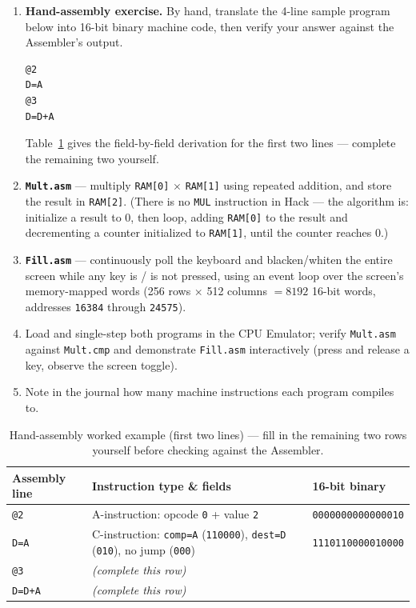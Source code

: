 \documentclass[11pt]{article}
\begin{document}
\begin{enumerate}
  \item \textbf{Hand-assembly exercise.} By hand, translate the 4-line sample program below into 16-bit binary machine code, then verify your answer against the Assembler's output.
\begin{verbatim}
@2
D=A
@3
D=D+A
\end{verbatim}
  Table~\ref{tab:lab4-handasm} gives the field-by-field derivation for the first two lines --- complete the remaining two yourself.

  \item \textbf{\texttt{Mult.asm}} --- multiply \texttt{RAM[0]} $\times$ \texttt{RAM[1]} using repeated addition, and store the result in \texttt{RAM[2]}. (There is no \texttt{MUL} instruction in Hack --- the algorithm is: initialize a result to 0, then loop, adding \texttt{RAM[0]} to the result and decrementing a counter initialized to \texttt{RAM[1]}, until the counter reaches 0.)

  \item \textbf{\texttt{Fill.asm}} --- continuously poll the keyboard and blacken/whiten the entire screen while any key is / is not pressed, using an event loop over the screen's memory-mapped words (256 rows $\times$ 512 columns $= 8192$ 16-bit words, addresses \texttt{16384} through \texttt{24575}).

  \item Load and single-step both programs in the CPU Emulator; verify \texttt{Mult.asm} against \texttt{Mult.cmp} and demonstrate \texttt{Fill.asm} interactively (press and release a key, observe the screen toggle).

  \item Note in the journal how many machine instructions each program compiles to.
\end{enumerate}

\begin{table}[h]
\centering
\small
\begin{tabular}{@{}l l l@{}}
\toprule
Assembly line & Instruction type \& fields & 16-bit binary \\
\midrule
\texttt{@2} & A-instruction: opcode \texttt{0} + value \texttt{2} & \texttt{0000000000000010} \\
\texttt{D=A} & C-instruction: \texttt{comp=A} (\texttt{110000}), \texttt{dest=D} (\texttt{010}), no jump (\texttt{000}) & \texttt{1110110000010000} \\
\texttt{@3} & \emph{(complete this row)} & \\
\texttt{D=D+A} & \emph{(complete this row)} & \\
\bottomrule
\end{tabular}
\caption{Hand-assembly worked example (first two lines) --- fill in the remaining two rows yourself before checking against the Assembler.}
\label{tab:lab4-handasm}
\end{table}
\end{document}

